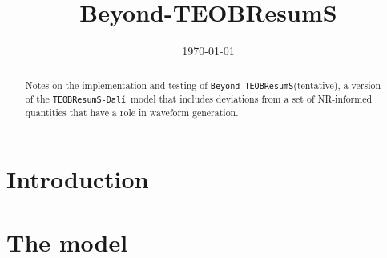 \documentclass[prd,amssymb,amsmath,amsfonts,nofootinbib,reprint,showpacs,longbibliography]{revtex4-1}
\def\TEOBResumSDali{\texttt{TEOBResumS-Dalí}}
\def\TEOBB{\texttt{Beyond-TEOBResumS}}
\begin{document}
\title{Beyond-TEOBResumS}


\begin{abstract}
Notes on the implementation and testing of \TEOBB (tentative), a version of the \TEOBResumSDali~model that includes
deviations from a set of NR-informed quantities that have a role in waveform generation.
\end{abstract}

\date{\today}
\maketitle

\acresetall

\section{Introduction}

\section{The model}
\end{document}
